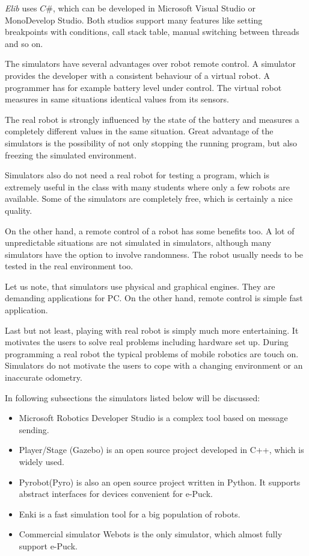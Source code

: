 \documentclass[12pt,notitlepage]{report}
\begin{document}
	{\it Elib} uses $C\#$, which can be developed in Microsoft Visual Studio or MonoDevelop Studio.
	Both studios support many features like setting breakpoints with conditions, call stack table,
	manual switching between threads and so on.
	
	The simulators have several advantages over robot remote control.
	A simulator provides the developer with a consistent behaviour of a virtual robot.
	A programmer has for example battery level under control. 
	The virtual robot measures in same situations identical values from its sensors. 
	
	The real robot is strongly influenced by the state of the battery
	and measures a completely different values in the same situation.
	Great advantage of the simulators is the possibility of not only stopping
	the running program, but also freezing the simulated environment. 
	
	Simulators also do not need a real robot for testing a program, which is extremely
	useful in the class with many students where only a few robots are available.
	Some of the simulators are completely free, which is certainly a nice quality.
	
	On the other hand, a remote control of a robot has some benefits too. 
	A lot of unpredictable situations are not simulated in simulators, although 
	many simulators have the option to involve randomness. The robot usually
	needs to be tested in the real environment too.
	
	Let us note, that simulators use physical and graphical engines. They are demanding applications
	for PC. 
	On the other hand, remote control is simple fast application.
	
	Last but not least, playing with real robot is simply much more entertaining. 	
	It motivates the users to solve real problems including hardware set up. 
	During programming a real robot the typical problems of mobile robotics are touch on.
	Simulators do not motivate the users to cope with a changing environment or an inaccurate odometry.
	
	In following subsections the simulators listed below will be discussed:
	\begin{itemize}
	\item Microsoft Robotics Developer Studio\cite{msrs} is a complex tool based on message sending.
	\item Player/Stage\cite{player} (Gazebo) is an open source project developed in C++, which is widely used.
	\item Pyrobot(Pyro)\cite{pyro} is also an open source project written in Python. It supports abstract
	interfaces for devices convenient for e-Puck.
	\item Enki\cite{enki} is a fast simulation tool for a big population of robots.
	\item Commercial simulator Webots\cite{webots} is the only simulator, which almost fully support e-Puck. 
	\end{itemize}
\end{document}
